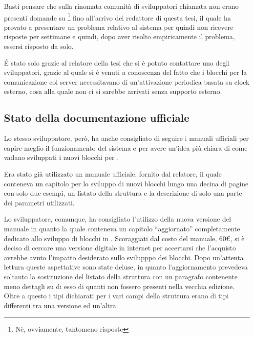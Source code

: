 Basti pensare che sulla rinomata comunità di sviluppatori chiamata
 non erano presenti domande su
\SciCos{}\footnote{Nè, ovviamente, tantomeno risposte} fino all'arrivo del
redattore di questa tesi, il quale ha provato a presentare un problema
relativo al sistema per quindi non ricevere risposte per settimane e
quindi, dopo aver risolto empiricamente il problema, essersi risposto da
solo\cite{bib:SciCosOnSO}.

\'E stato solo grazie al relatore della tesi che si è potuto contattare uno
degli sviluppatori, grazie al quale si è venuti a conoscenza del fatto che
i blocchi per la comunicazione col server necessitavano di un'attivazione
periodica basata su clock esterno, cosa alla quale non ci si sarebbe
arrivati senza supporto esterno.

\subsection{Stato della documentazione ufficiale}
Lo stesso sviluppatore, però, ha anche consigliato di seguire i manuali
ufficiali per capire meglio il funzionamento del sistema e per avere
un'idea più chiara di come vadano sviluppati i nuovi blocchi per \SciCos{}.

Era stato già utilizzato un manuale ufficiale\cite{bib:SciCosMan1}, fornito
dal relatore, il quale conteneva un capitolo per lo sviluppo di nuovi
blocchi lungo una decina di pagine con solo due esempi, un listato della
struttura  e la descrizione di solo una parte dei
parametri utilizzati.

Lo sviluppatore, comunque, ha consigliato l'utilizzo della nuova versione
del manuale\cite{bib:SciCosMan2} in quanto la quale conteneva un capitolo
``aggiornato'' completamente dedicato allo sviluppo di blocchi in
.
Scoraggiati dal costo del manuale, 60€, si è deciso di cercare una versione
digitale in internet per accertarsi che l'acquisto avrebbe avuto l'impatto
desiderato sullo svilupppo dei blocchi. Dopo un'attenta lettura queste
aspettative sono state deluse, in quanto l'aggiornamento prevedeva soltanto
la sostituzione del listato della struttura con un paragrafo contenente
meno dettagli su di esso di quanti non fossero presenti nella vecchia
edizione. Oltre a questo i tipi dichiarati per i vari campi della struttura
erano di tipi differenti tra una versione ed un'altra.

